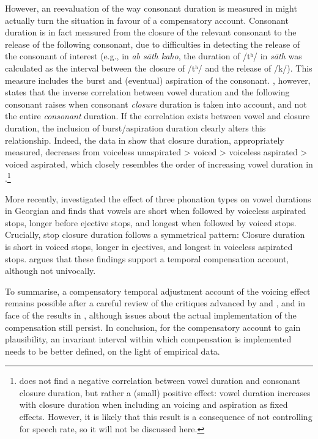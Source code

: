 \documentclass[preprint]{JASAnew}
\begin{document}
However, an reevaluation of the way consonant duration is measured in
\citet{maddieson1976} might actually turn the situation in favour of a
compensatory account. Consonant duration is in fact measured from the
closure of the relevant consonant to the release of the following
consonant, due to difficulties in detecting the release of the consonant
of interest (e.g., in \emph{ab sāth kaho}, the duration of /tʰ/ in
\emph{sāth} was calculated as the interval between the closure of /tʰ/
and the release of /k/). This measure includes the burst and (eventual)
aspiration of the consonant. \citet{slis1969a}, however, states that the
inverse correlation between vowel duration and the following consonant
raises when consonant \emph{closure} duration is taken into account, and
not the entire \emph{consonant} duration. If the correlation exists
between vowel and closure duration, the inclusion of burst/aspiration
duration clearly alters this relationship. Indeed, the data in
\citet{durvasula2012} show that closure duration, appropriately
measured, decreases from voiceless unaspirated \textgreater{} voiced
\textgreater{} voiceless aspirated \textgreater{} voiced aspirated,
which closely resembles the order of increasing vowel duration in
\citet{maddieson1976}.\footnote{\citet{durvasula2012} does not find a negative correlation between vowel duration and consonant closure duration, but rather a (small) positive effect: vowel duration increases with closure duration when including an voicing and aspiration as fixed effects. However, it is likely that this result is a consequence of not controlling for speech rate, so it will not be discussed here.}

More recently, \citet{begus2017} investigated the effect of three
phonation types on vowel durations in Georgian and finds that vowels are
short when followed by voiceless aspirated stops, longer before ejective
stops, and longest when followed by voiced stops. Crucially, stop
closure duration follows a symmetrical pattern: Closure duration is
short in voiced stops, longer in ejectives, and longest in voiceless
aspirated stops. \citet{begus2017} argues that these findings support a
temporal compensation account, although not univocally.

To summarise, a compensatory temporal adjustment account of the voicing
effect remains possible after a careful review of the critiques advanced
by \citet{chen1970} and \citet{maddieson1976}, and in face of the
results in \citet{begus2017}, although issues about the actual
implementation of the compensation still persist. In conclusion, for the
compensatory account to gain plausibility, an invariant interval within
which compensation is implemented needs to be better defined, on the
light of empirical data.
\end{document}
